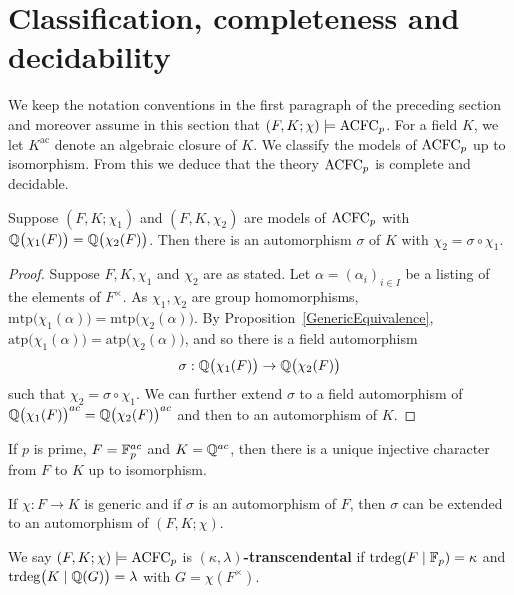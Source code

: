 \section{Classification, completeness and decidability}

\noindent
We keep the notation conventions in the first paragraph of the preceding section and moreover assume in this section that $(F, K; \chi) \models \mathrm{ACFC}_p$. For a field $K$, we let $K^{\text{ac}}$ denote an algebraic closure of $K$.
We classify the models of $\mathrm{ACFC}_p$ up to isomorphism. From this we deduce that the theory $\mathrm{ACFC}_p$ is complete and decidable.


\begin{prop}\label{CharacterIsomorphism}
Suppose $(F, K; \chi_1)$ and $(F, K, \chi_2)$ are models of $\mathrm{ACFC}_p$ with \( \mathbb{Q}\big(\chi_1(F) \big)= \mathbb{Q}\big(\chi_2(F) \big)\). Then there is an automorphism  \(\sigma\) of \(K\) with \( \chi_2 = \sigma \circ \chi_1 \). 
\end{prop}

\begin{proof}
Suppose $F, K,\chi_1$ and $\chi_2$ are as stated. Let \(\alpha= (\alpha_i)_{i \in I}\) be a listing of the elements of \(F^\times\). As \( \chi_1, \chi_2 \) are group homomorphisms, \( \text{mtp}\big(\chi_1(\alpha)\big) = \text{mtp}\big(\chi_2(\alpha)\big)  \). By Proposition~\ref{GenericEquivalence}, \( \text{atp}\big(\chi_1(\alpha)\big) = \text{atp}\big(\chi_2(\alpha)\big) \),  and so there is a field automorphism 
$$\sigma: \mathbb{Q}\big(\chi_1(F) \big) \to \mathbb{Q}\big(\chi_2(F) \big) $$ 
such that \( \chi_2 = \sigma \circ \chi_1 \).
We can further extend $\sigma$ to a field automorphism of \(\mathbb{Q}\big(\chi_1(F) \big)^{ac}= \mathbb{Q}\big(\chi_2(F) \big)^{ac}  \) and then to an automorphism of \(K\).
\end{proof}

\begin{cor} \label{UniquenessOfChar}
If $p$ is prime, $F = \mathbb{F}_{p}^{ac}$ and  $K = \mathbb{Q}^{ac}$, then there is a unique injective character from $F$ to $K$ up to isomorphism.
\end{cor}

\begin{cor} \label{AutExt}
If $\chi: F \to K$ is generic and if $\sigma$ is an automorphism of $F$, then $\sigma$ can be extended to an automorphism of \((F, K;\chi)\).
\end{cor}

\noindent
We say  $(F,K;\chi) \models \mathrm{ACFC}_p$ is {\bf $(\kappa,\lambda)$-transcendental} if $\mathrm{trdeg}(F \mid \mathbb{F}_p)=\kappa $ and $\mathrm{trdeg}\big(K \mid \mathbb{Q}(G)\big)  = \lambda $ with $G=\chi(F^\times)$.

